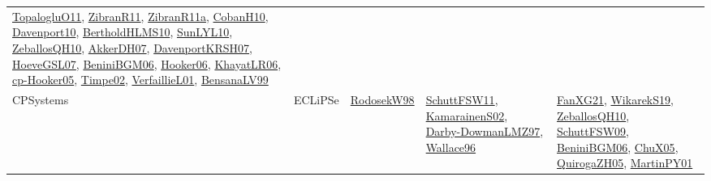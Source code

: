 {\begin{longtable}{lp{3cm}>{\raggedright}p{6cm}>{\raggedright}p{6cm}p{8cm}}
\href{articles/TopalogluO11.pdf}{TopalogluO11}\cite{TopalogluO11}, \href{papers/ZibranR11.pdf}{ZibranR11}\cite{ZibranR11}, \href{papers/ZibranR11a.pdf}{ZibranR11a}\cite{ZibranR11a}, \href{papers/CobanH10.pdf}{CobanH10}\cite{CobanH10}, \href{papers/Davenport10.pdf}{Davenport10}\cite{Davenport10}, \href{papers/BertholdHLMS10.pdf}{BertholdHLMS10}\cite{BertholdHLMS10}, \href{papers/SunLYL10.pdf}{SunLYL10}\cite{SunLYL10}, \href{articles/ZeballosQH10.pdf}{ZeballosQH10}\cite{ZeballosQH10}, \href{papers/AkkerDH07.pdf}{AkkerDH07}\cite{AkkerDH07}, \href{papers/DavenportKRSH07.pdf}{DavenportKRSH07}\cite{DavenportKRSH07}, \href{papers/HoeveGSL07.pdf}{HoeveGSL07}\cite{HoeveGSL07}, \href{papers/BeniniBGM06.pdf}{BeniniBGM06}\cite{BeniniBGM06}, \href{articles/Hooker06.pdf}{Hooker06}\cite{Hooker06}, \href{articles/KhayatLR06.pdf}{KhayatLR06}\cite{KhayatLR06}, \href{papers/cp-Hooker05.pdf}{cp-Hooker05}\cite{cp-Hooker05}, \href{articles/Timpe02.pdf}{Timpe02}\cite{Timpe02}, \href{papers/VerfaillieL01.pdf}{VerfaillieL01}\cite{VerfaillieL01}, \href{articles/BensanaLV99.pdf}{BensanaLV99}\cite{BensanaLV99}\\
CPSystems & ECLiPSe & \href{papers/RodosekW98.pdf}{RodosekW98}\cite{RodosekW98} & \href{articles/SchuttFSW11.pdf}{SchuttFSW11}\cite{SchuttFSW11}, \href{papers/KamarainenS02.pdf}{KamarainenS02}\cite{KamarainenS02}, \href{articles/Darby-DowmanLMZ97.pdf}{Darby-DowmanLMZ97}\cite{Darby-DowmanLMZ97}, \href{articles/Wallace96.pdf}{Wallace96}\cite{Wallace96} & \href{articles/FanXG21.pdf}{FanXG21}\cite{FanXG21}, \href{articles/WikarekS19.pdf}{WikarekS19}\cite{WikarekS19}, \href{articles/ZeballosQH10.pdf}{ZeballosQH10}\cite{ZeballosQH10}, \href{papers/SchuttFSW09.pdf}{SchuttFSW09}\cite{SchuttFSW09}, \href{papers/BeniniBGM06.pdf}{BeniniBGM06}\cite{BeniniBGM06}, \href{papers/ChuX05.pdf}{ChuX05}\cite{ChuX05}, \href{papers/QuirogaZH05.pdf}{QuirogaZH05}\cite{QuirogaZH05}, \href{articles/MartinPY01.pdf}{MartinPY01}\cite{MartinPY01}\\

\end{longtable}}
